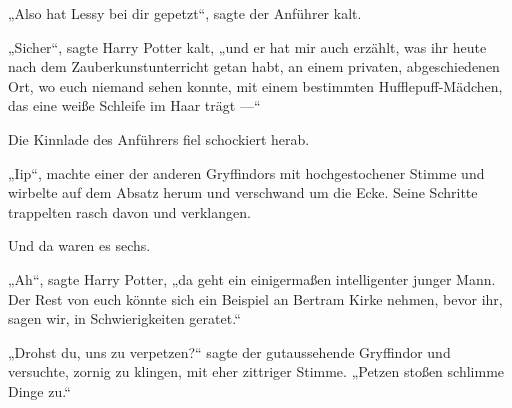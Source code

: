 „Also hat Lessy bei dir gepetzt“, sagte der Anführer kalt.

„Sicher“, sagte Harry Potter kalt, „und er hat mir auch erzählt, was ihr heute nach dem Zauberkunstunterricht getan habt, an einem privaten, abgeschiedenen Ort, wo euch niemand sehen konnte, mit einem bestimmten Hufflepuff-Mädchen, das eine weiße Schleife im Haar trägt —“

Die Kinnlade des Anführers fiel schockiert herab.

„Iip“, machte einer der anderen Gryffindors mit hochgestochener Stimme und wirbelte auf dem Absatz herum und verschwand um die Ecke. Seine Schritte trappelten rasch davon und verklangen.

Und da waren es sechs.

„Ah“, sagte Harry Potter, „da geht ein einigermaßen intelligenter junger Mann. Der Rest von euch könnte sich ein Beispiel an Bertram Kirke nehmen, bevor ihr, sagen wir, in Schwierigkeiten geratet.“%

„Drohst du, uns zu verpetzen?“ sagte der gutaussehende Gryffindor und versuchte, zornig zu klingen, mit eher zittriger Stimme.
„Petzen stoßen schlimme Dinge zu.“

